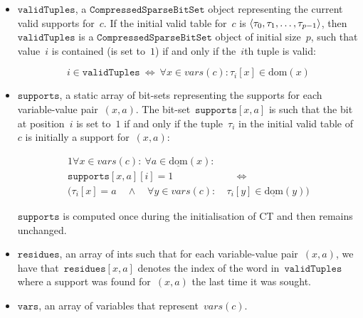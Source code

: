 \documentclass[a4paper,11pt]{article}
\newcommand{\Dom}[1]{\text{dom}({#1})}
\newcommand{\Dominit}[1]{\underline{\text{dom}}(#1)}
\newcommand{\Words}{\texttt{words}}
\newcommand{\SparseBitSet}{\texttt{CompressedSparseBitSet}}
\newcommand{\CurrTable}{\texttt{validTuples}}
\newcommand{\Supports}{\texttt{supports}}
\newcommand{\Residues}{\texttt{residues}}
\newcommand{\Vars}{\texttt{vars}}
\numberwithin{equation}{section}
\begin{document}
\begin{itemize}
  
  \item $\CurrTable$, a $\SparseBitSet$ object representing the current valid
    supports for~$c$. If the initial valid table for~$c$
    is $\left\langle\tau_0, \tau_1, \ldots, \tau_{p-1}\right\rangle$,
    then~$\CurrTable$ is a 
    $\SparseBitSet$ object of initial size~$p$, such that value~$i$
    is contained (is set to~$1$) if and only if the~$i$th tuple is valid:
    
    \begin{equation} \label{eq:currtable}
      i \in \CurrTable \ \Leftrightarrow \ \forall x \in \mathit{vars}(c): \tau_i[x] \in \Dom{x}
    \end{equation}

  \item $\Supports$, a static array of bit-sets representing
    the supports for each variable-value pair~$(x,a)$.
    The bit-set~$\Supports[x,a]$ is such that
    the bit at position~$i$ is set to~$1$ if and only if the 
    tuple~$\tau_i$ in the initial valid table of~$c$ is initially a support for~$(x,a)$:

    \begin{alignat}{1}
      \forall x \in \mathit{vars}(c): \ \forall a \in \Dominit{x}:& \\
      \Supports[x,a][i] = 1 &\quad \Leftrightarrow \\
      (\tau_i[x] = a \quad \land \quad
      \forall y \in \mathit{vars}(c): \ &\tau_i[y] \in \Dominit{y})
    \end{alignat}

    $\Supports$ is computed once during the initialisation of CT and then
    remains unchanged.
    
  \item $\Residues$, an array of ints such that for each variable-value pair~$(x,a)$,
    we have that~$\Residues[x,a]$ denotes the index
    of the word in~$\CurrTable$
    where a support was found for~$(x,a)$ the last time it was sought.

  \item $\Vars$, an array of variables that represent~$\mathit{vars}(c)$.

\end{itemize}
\end{document}
